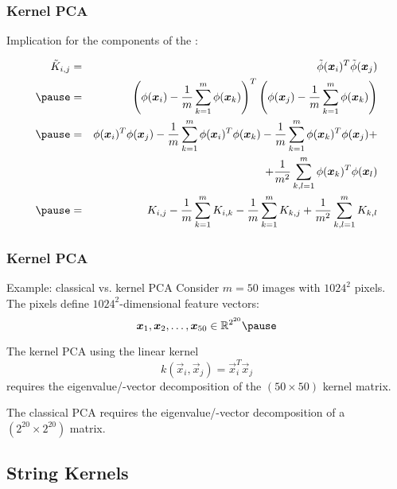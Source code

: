 \begin{frame}
	\frametitle{Kernel PCA}

	Implication for the components of the :

	\small
	\begin{eqnarray*}
		\tilde{K} _{i,j}
		&=& \tilde\phi(\vec x_i) ^T  \tilde\phi(\vec x_j) \\ \pause
		&=& \left( \phi(\vec x_i) - \frac{1}{m}\sum_{k=1}^m \phi(\vec x_k) \right)^T
		\left( \phi(\vec x_j) - \frac{1}{m}\sum_{k=1}^m \phi(\vec x_k) \right) \\ \pause
		&=& \phi(\vec x_i)^T \phi(\vec x_j) -
		\frac{1}{m}\sum_{k=1}^m \phi(\vec x_i)^T \phi(\vec x_k) -
		\frac{1}{m}\sum_{k=1}^m \phi(\vec x_k)^T  \phi(\vec x_j) + \\
		& & \quad + \frac{1}{m^2}\sum_{k,l=1}^m \phi(\vec x_k)^T \phi(\vec x_l) \\ \pause
		&=& K_{i,j} -
		\frac{1}{m}\sum_{k=1}^m K_{i,k} -
		\frac{1}{m}\sum_{k=1}^m K_{k,j} +
		\frac{1}{m^2}\sum_{k,l=1}^m K_{k,l}
	\end{eqnarray*}
\end{frame}


\begin{frame}
	\frametitle{Kernel PCA \cont}

	\begin{ovalblock}{Example: classical vs. kernel PCA}
		\small
		Consider $m=50$ images with $1024^2$ pixels.
		The pixels define $1024^2$-dimensional feature vectors:
		\begin{displaymath}
			\vec x_1, \vec x_2, \dots, \vec x_{50} \in \real^{2^{20}} \pause
		\end{displaymath}

		The kernel PCA using the linear kernel
		\begin{displaymath}
			k(\vec x_i, \vec x_j) = \vec x_i^T \vec x_j
		\end{displaymath}
		requires the eigenvalue/-vector decomposition of the $(50\times 50)$ kernel matrix. \\[.5cm] \pause

		The classical PCA requires the eigenvalue/-vector decomposition of a $(2^{20} \times 2^{20})$ matrix.
	\end{ovalblock}
\end{frame}


\subsection{String Kernels}


